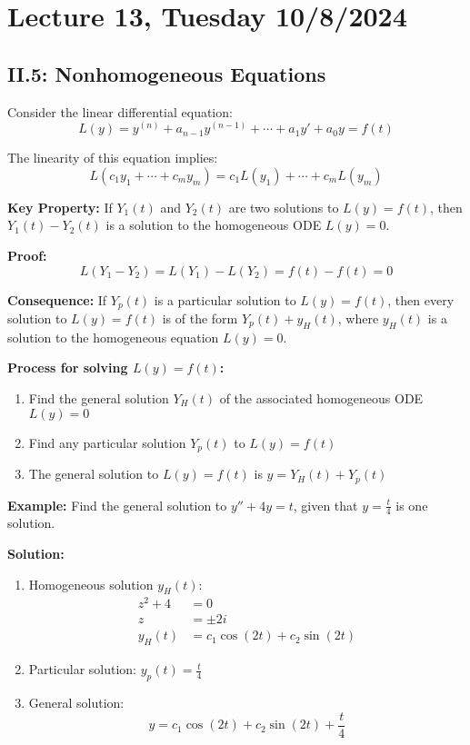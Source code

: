 \documentclass{article}
\begin{document}
\section*{Lecture 13, Tuesday 10/8/2024}

\subsection*{II.5: Nonhomogeneous Equations}

Consider the linear differential equation:
\[
L(y) = y^{(n)} + a_{n-1}y^{(n-1)} + \cdots + a_1y' + a_0y = f(t)
\]

The linearity of this equation implies:
\[
L(c_1y_1 + \cdots + c_my_m) = c_1L(y_1) + \cdots + c_mL(y_m)
\]

\textbf{Key Property:} If $Y_1(t)$ and $Y_2(t)$ are two solutions to $L(y) = f(t)$, then $Y_1(t) - Y_2(t)$ is a solution to the homogeneous ODE $L(y) = 0$.

\textbf{Proof:}
\[
L(Y_1 - Y_2) = L(Y_1) - L(Y_2) = f(t) - f(t) = 0
\]

\textbf{Consequence:} If $Y_p(t)$ is a particular solution to $L(y) = f(t)$, then every solution to $L(y) = f(t)$ is of the form $Y_p(t) + y_H(t)$, where $y_H(t)$ is a solution to the homogeneous equation $L(y) = 0$.

\textbf{Process for solving $L(y) = f(t)$:}
\begin{enumerate}
    \item Find the general solution $Y_H(t)$ of the associated homogeneous ODE $L(y) = 0$
    \item Find any particular solution $Y_p(t)$ to $L(y) = f(t)$
    \item The general solution to $L(y) = f(t)$ is $y = Y_H(t) + Y_p(t)$
\end{enumerate}

\textbf{Example:} Find the general solution to $y''+4y = t$, given that $y = \frac{t}{4}$ is one solution.

\textbf{Solution:}
\begin{enumerate}
    \item Homogeneous solution $y_H(t)$:
    \begin{align*}
        z^2+4 &= 0 \\
        z &= \pm 2i \\
        y_H(t) &= c_1\cos(2t) + c_2\sin(2t)
    \end{align*}

    \item Particular solution: $y_p(t) = \frac{t}{4}$

    \item General solution:
    \[
    y = c_1\cos(2t) + c_2\sin(2t) + \frac{t}{4}
    \]
\end{enumerate}
\end{document}
